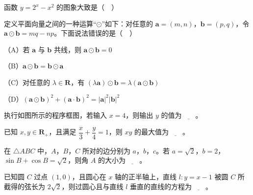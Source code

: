 \begingroup
\renewenvironment{question}{\Needspace{0.5\textheight}}{}
\begin{question}
函数 $y=2^x-x^2$ 的图象大致是（　）
\nopagebreak[4]
\begin{center}\end{center}
\nopagebreak[4]
\end{question}
\endgroup
\begin{question}
定义平面向量之间的一种运算“$\odot$”如下：对任意的 $\boldsymbol a=(m,n)$，$\boldsymbol b=(p,q)$，令 $\boldsymbol a\odot\boldsymbol b=mq-np$。下面说法错误的是（　）

（A）若 $\boldsymbol a$ 与 $\boldsymbol b$ 共线，则 $\boldsymbol a\odot\boldsymbol b=0$

（B）$\boldsymbol a\odot\boldsymbol b=\boldsymbol b\odot\boldsymbol a$

（C）对任意的 $\lambda\in\mathbf R$，有 $(\lambda\boldsymbol a)\odot\boldsymbol b=\lambda(\boldsymbol a\odot\boldsymbol b)$

（D）$(\boldsymbol a\odot\boldsymbol b)^2+(\boldsymbol a\cdot\boldsymbol b)^2=|\boldsymbol a|^2|\boldsymbol b|^2$

\end{question}

\Needspace{0.4\textheight}
\begingroup
\renewenvironment{question}{\Needspace{0.5\textheight}}{}
\begin{question}
执行如图所示的程序框图，若输入 $x=4$，则输出 $y$ 的值为$\underline{\qquad}$。
\nopagebreak[4]
\begin{center}\end{center}
\nopagebreak[4]
\end{question}
\endgroup
\begin{question}
已知 $x,y\in\mathbf R_+$，且满足 $\dfrac x3+\dfrac y4=1$，则 $xy$ 的最大值为$\underline{\qquad}$。

\end{question}
\begin{question}
在 $\triangle ABC$ 中，$A$，$B$，$C$ 所对的边分别为 $a$，$b$，$c$。若 $a=\sqrt2$，$b=2$，$\sin B+\cos B=\sqrt2$，则角 $A$ 的大小为$\underline{\qquad}$。

\end{question}
\begin{question}
已知圆 $C$ 过点 $(1,0)$，且圆心在 $x$ 轴的正半轴上，直线 $l:y=x-1$ 被圆 $C$ 所截得的弦长为 $2\sqrt2$，则过圆心且与直线 $l$ 垂直的直线的方程为$\underline{\qquad}$。

\end{question}

